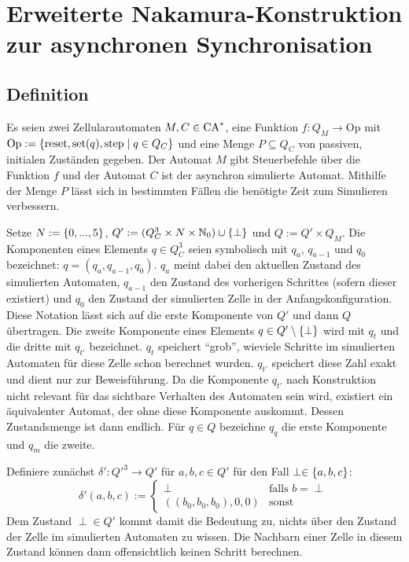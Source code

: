 \chapter{Erweiterte Nakamura-Konstruktion zur asynchronen Synchronisation}
\label{chap:ErweiterteNakamuraKonstr}

\section{Definition}

\begin{definition}
    \label{erweiterteNakamuraKonstruktion}
    Es seien zwei Zellularautomaten $M, C \in \textrm{CA}^*$, eine Funktion $f: Q_M \to \mathrm{Op}$ mit $\mathrm{Op} := \{ {
        \mathrm{reset}, \mathrm{set}(q), \mathrm{step} } \; | \; { q \in Q_C } \}$ und eine Menge $P \subseteq Q_C$ von passiven, initialen Zuständen gegeben.
    Der Automat $M$ gibt Steuerbefehle über die Funktion $f$ und der Automat $C$ ist der asynchron simulierte Automat.
    Mithilfe der Menge $P$ lässt sich in bestimmten Fällen
    die benötigte Zeit zum Simulieren verbessern.
    
    Setze $N := \{ { 0, ..., 5 } \}$, $Q' := (Q_C^3 \times N \times \mathbb{N}_0) \cup \{ { \perp } \}$ und $Q := Q' \times Q_M$.
    Die Komponenten eines Elements $q \in Q_C^3$ seien symbolisch mit $q_a$, $q_{a-1}$ und $q_0$ bezeichnet: $q = (q_a, q_{a-1}, q_0)$.
    $q_a$ meint dabei den aktuellen Zustand des simulierten Automaten, $q_{a-1}$ den Zustand des vorherigen Schrittes (sofern dieser existiert) und $q_0$ den Zustand der simulierten Zelle in der Anfangskonfiguration.
    Diese Notation lässt sich auf die erste Komponente von $Q'$ und dann $Q$ übertragen. Die zweite Komponente eines Elements $q \in Q' \setminus \{ { \perp } \}$ wird mit $q_t$ und die dritte mit $q_{t'}$ bezeichnet. $q_t$ speichert \enquote{grob}, wieviele Schritte im simulierten Automaten für diese Zelle schon berechnet wurden. $q_{t'}$ speichert diese Zahl exakt und dient nur zur Beweisführung. Da die Komponente $q_{t'}$
    nach Konstruktion nicht relevant für das sichtbare Verhalten des Automaten sein wird, existiert ein äquivalenter Automat, der ohne diese Komponente auskommt. Dessen Zustandsmenge ist dann endlich.
    Für $q \in Q$ bezeichne $q_q$ die erste Komponente und $q_m$ die zweite.
    
    Definiere zunächst $\delta': {Q'}^3 \to Q'$ für $a, b, c \in Q'$ für den Fall $\perp \in \{ { a, b, c } \}$:
    \[
        \delta'(a, b, c) := 
        \begin{cases}
            \perp & \text{falls } b = \perp \\
            ((b_0, b_0, b_0), 0, 0) & \text{sonst}
        \end{cases}
    \]
    Dem Zustand $\perp \in Q'$ kommt damit die Bedeutung zu, nichts über den Zustand der Zelle im simulierten Automaten zu wissen.
    Die Nachbarn einer Zelle in diesem Zustand können dann offensichtlich keinen Schritt berechnen.
    

\end{definition}
